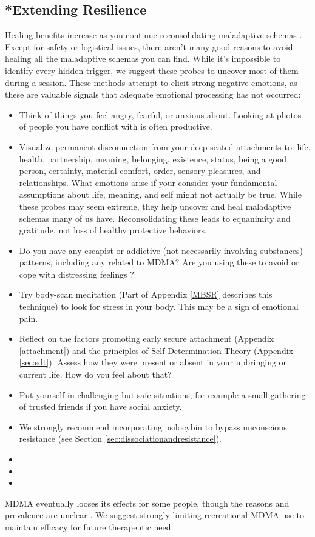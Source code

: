 \documentclass[12pt,letterpaper]{article}
\begin{document}
\subsection{*Extending Resilience}
\label{completed}
Healing benefits increase as you continue reconsolidating maladaptive schemas \cite{rachmanProcessing}. Except for safety or logistical issues, there aren't many good reasons to avoid healing all the maladaptive schemas you can find. While it's impossible to identify every hidden trigger, we suggest these probes to uncover most of them during a session. These methods attempt to elicit strong negative emotions, as these are valuable signals that adequate emotional processing has not occurred:
\begin{itemize}
    \item Think of things you feel angry, fearful, or anxious about. Looking at photos of people you have conflict with is often productive.
    \item Visualize permanent disconnection from your deep-seated attachments to: life, health, partnership, meaning, belonging, existence, status, being a good person, certainty, material comfort, order, sensory pleasures, and relationships. What emotions arise if your consider your fundamental assumptions about life, meaning, and self might not actually be true. While these probes may seem extreme, they help uncover and heal maladaptive schemas many of us have. Reconsolidating these leads to equanimity and gratitude, not loss of healthy protective behaviors.
    \item Do you have any escapist or addictive (not necessarily involving substances) patterns, including any related to MDMA? Are you using these to avoid or cope with distressing feelings \cite{forsterTraumaAddiction,alaviBehavioralAddiction}?
    \item Try body-scan meditation (Part of Appendix \ref{MBSR} describes this technique) to look for stress in your body. This may be a sign of emotional pain.
    \item Reflect on the factors promoting early secure attachment (Appendix \ref{attachment}) and the principles of Self Determination Theory (Appendix \ref{sec:sdt}). Assess how they were present or absent in your upbringing or current life. How do you feel about that?
    \item Put yourself in challenging but safe situations, for example a small gathering of trusted friends if you have social anxiety.
    \item We strongly recommend incorporating psilocybin to bypass unconscious resistance (see Section \ref{sec:dissociationandresistance}).
    \item {}
    \item {}
    \item {}
\end{itemize}
MDMA eventually looses its effects for some people, though the reasons and prevalence are unclear \cite{parrottTolerance}. We suggest strongly limiting recreational MDMA use to maintain efficacy for future therapeutic need.
\end{document}
